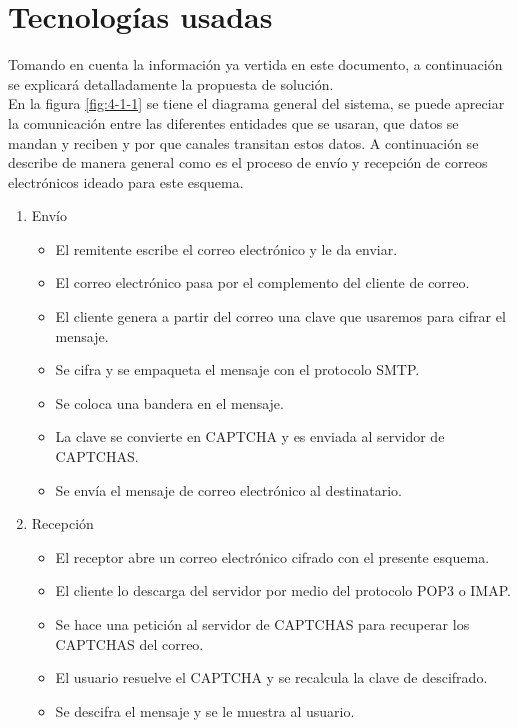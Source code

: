 \chapter{Tecnologías usadas}

Tomando en cuenta la información ya vertida en este documento, a continuación se explicará detalladamente la propuesta de solución.\\
En la figura \ref{fig:4-1-1} se tiene el diagrama general del sistema, se puede apreciar la comunicación entre las diferentes entidades que se usaran, que datos se mandan y reciben y por que canales transitan estos datos. A continuación se describe de manera general como es el proceso de envío y recepción de correos electrónicos ideado para este esquema.\\
\begin{enumerate}
 \item {Envío}
\begin{itemize}
\item El remitente escribe el correo electrónico y le da enviar.\\
\item El correo electrónico pasa por el complemento del cliente de correo.\\
\item El cliente genera a partir del correo una clave que usaremos para cifrar el mensaje.\\
\item Se cifra y se empaqueta el mensaje con el protocolo SMTP.\\
\item Se coloca una bandera en el mensaje.\\
\item La clave se convierte en CAPTCHA y es enviada al servidor de CAPTCHAS.\\
\item Se envía el mensaje de correo electrónico al destinatario.\\
\end{itemize}

\item{Recepción}
\begin{itemize}
\item El receptor abre un correo electrónico cifrado con el presente esquema.\\
\item El cliente lo descarga del servidor por medio del protocolo POP3 o IMAP.\\
\item Se hace una petición al servidor de CAPTCHAS para recuperar los CAPTCHAS del correo.\\
\item El usuario resuelve el CAPTCHA y se recalcula la clave de descifrado.\\
\item Se descifra el mensaje y se le muestra al usuario.\\
\end{itemize}
\end{enumerate}
